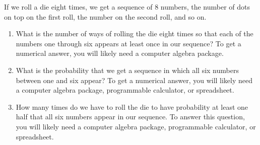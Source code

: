 \documentclass{book}
\begin{document}
\setcounter{project}{232}
\addtocounter{project}{-1}
\begin{activity}[]\label{activity-225}
\hypertarget{p-1272}{}%
If we roll a die eight times, we get a sequence of 8 numbers, the number of dots on top on the first roll, the number on the second roll, and so on.%
\begin{enumerate}[font=\bfseries,label=(\alph*),ref=\alph*]
\item\label{task-233} \hypertarget{p-1273}{}%
What is the number of ways of rolling the die eight times so that each of the numbers one through six appears at least once in our sequence? To get a numerical answer, you will likely need a computer algebra package.%
\item\label{task-234} \hypertarget{p-1275}{}%
What is the probability that we get a sequence in which all six numbers between one and six appear? To get a numerical answer, you will likely need a computer algebra package, programmable calculator, or spreadsheet.%
\item\label{task-235} \hypertarget{p-1277}{}%
How many times do we have to roll the die to have probability at least one half that all six numbers appear in our sequence. To answer this question, you will likely need a computer algebra package, programmable calculator, or spreadsheet.%
\end{enumerate}
\end{activity}
\end{document}
